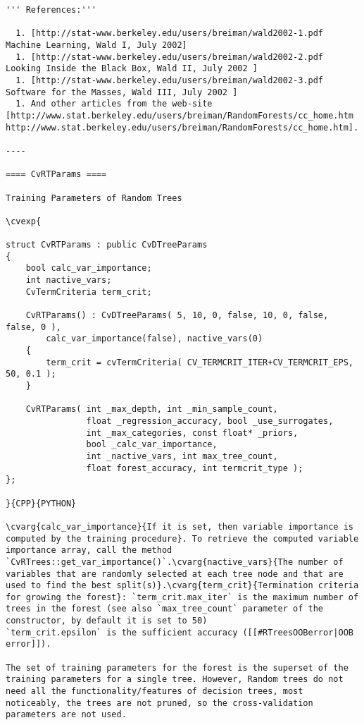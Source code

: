 \begin{verbatim}
''' References:'''

  1. [http://stat-www.berkeley.edu/users/breiman/wald2002-1.pdf  Machine Learning, Wald I, July 2002]
  1. [http://stat-www.berkeley.edu/users/breiman/wald2002-2.pdf  Looking Inside the Black Box, Wald II, July 2002 ]
  1. [http://stat-www.berkeley.edu/users/breiman/wald2002-3.pdf  Software for the Masses, Wald III, July 2002 ]
  1. And other articles from the web-site [http://www.stat.berkeley.edu/users/breiman/RandomForests/cc_home.htm  http://www.stat.berkeley.edu/users/breiman/RandomForests/cc_home.htm].

----

==== CvRTParams ====

Training Parameters of Random Trees

\cvexp{

struct CvRTParams : public CvDTreeParams
{
    bool calc_var_importance;
    int nactive_vars;
    CvTermCriteria term_crit;

    CvRTParams() : CvDTreeParams( 5, 10, 0, false, 10, 0, false, false, 0 ),
        calc_var_importance(false), nactive_vars(0)
    {
        term_crit = cvTermCriteria( CV_TERMCRIT_ITER+CV_TERMCRIT_EPS, 50, 0.1 );
    }

    CvRTParams( int _max_depth, int _min_sample_count,
                float _regression_accuracy, bool _use_surrogates,
                int _max_categories, const float* _priors,
                bool _calc_var_importance,
                int _nactive_vars, int max_tree_count,
                float forest_accuracy, int termcrit_type );
};

}{CPP}{PYTHON}

\cvarg{calc_var_importance}{If it is set, then variable importance is computed by the training procedure}. To retrieve the computed variable importance array, call the method `CvRTrees::get_var_importance()`.\cvarg{nactive_vars}{The number of variables that are randomly selected at each tree node and that are used to find the best split(s)}.\cvarg{term_crit}{Termination criteria for growing the forest}: `term_crit.max_iter` is the maximum number of trees in the forest (see also `max_tree_count` parameter of the constructor, by default it is set to 50)
`term_crit.epsilon` is the sufficient accuracy ([[#RTreesOOBerror|OOB error]]).

The set of training parameters for the forest is the superset of the training parameters for a single tree. However, Random trees do not need all the functionality/features of decision trees, most noticeably, the trees are not pruned, so the cross-validation parameters are not used.


\end{verbatim}
